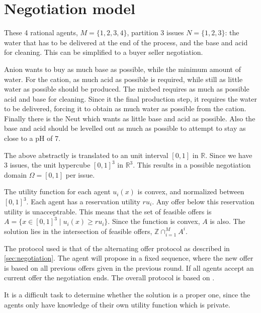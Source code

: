 \section{Negotiation model}

These 4 rational agents, $M = \{1,2,3, 4\}$, partition 3 issues $N=\{1,2,3\}$: the water that has to be delivered at the end of the process, and the base and acid for cleaning.  This can be simplified to a buyer seller negotiation.

Anion wants to buy as much base as possible, while the minimum amount of water. For the cation, as much acid as possible is required, while still as little water as possible should be produced. The mixbed requires as much as possible acid and base for cleaning. Since it the final production step, it requires the water to be delivered, forcing it to obtain as much water as possible from the cation. Finally there is the Neut which wants as little base and acid as possible. Also the base and acid should be levelled out as much as possible to attempt to stay as close to a pH of $7$. 

The above abstractly is translated to an unit interval $[0, 1]$ in $\mathbb{R}$. Since we have $3$ issues, the unit hypercube $[0, 1]^3$ in  $\mathbb{R}^3$. This results in a possible negotiation domain $\Omega = [0,1]$ per issue.

The utility function for each agent $u_i(x)$ is convex, and normalized between $[0, 1]^3$. Each agent has a reservation utility $ru_i$. Any offer below this reservation utility is unacceptrable. This means that the set of feasible offers is $A = \{ x\in [0,1]^3 \mid u_i(x)\geq ru_i\}$. Since the function is convex, $A$ is also. The solution lies in the intersection of feasible offers, $\mathbb{Z} \cap^M_{i=1}A^i$.

The protocol used is that of the alternating offer protocol as described in \cref{sec:negotiation}. The agent will propose in a fixed sequence, where the new offer is based on all previous offers given in the previous round. If all agents accept an current offer the negotiation ends. The overall protocol is based on \citet{zheng2015automated}. 

It is a difficult task to determine whether the solution is a proper one, since the agents only have knowledge of their own utility function which is private. 


